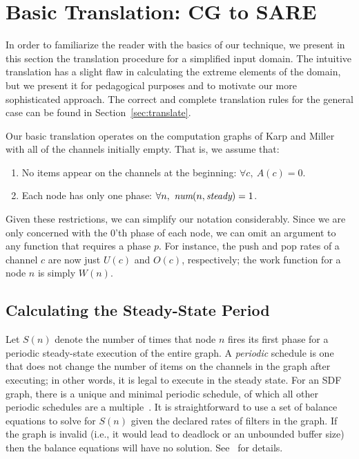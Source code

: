 \section{Basic Translation: CG to SARE}
\label{sec:simple}

In order to familiarize the reader with the basics of our technique,
we present in this section the translation procedure for a simplified
input domain.  The intuitive translation has a slight flaw in
calculating the extreme elements of the domain, but we present it for
pedagogical purposes and to motivate our more sophisticated approach.
The correct and complete translation rules for the general case can be
found in Section~\ref{sec:translate}.

Our basic translation operates on the computation graphs of Karp and
Miller~\cite{KM66} with all of the channels initially empty.  That is,
we assume that:
\begin{enumerate}

\item No items appear on the channels at the beginning:  $\forall c,~A(c) = 0$.

\item Each node has only one phase: $\forall n,~\mbox{\it num}(n, \mbox{\it steady}) = 1$.

\end{enumerate}

Given these restrictions, we can simplify our notation considerably.
Since we are only concerned with the 0'th phase of each node, we can
omit an argument to any function that requires a phase $p$.  For
instance, the push and pop rates of a channel $c$ are now just $U(c)$
and $O(c)$, respectively; the work function for a node $n$ is simply
$W(n)$.



\subsection{Calculating the Steady-State Period}
\label{sec:balance}

Let $S(n)$ denote the number of times that node $n$ fires its first
phase for a periodic steady-state execution of the entire graph. A
{\it periodic} schedule is one that does not change the number of
items on the channels in the graph after executing; in other words, it
is legal to execute in the steady state.  For an SDF graph, there is a
unique and minimal periodic schedule, of which all other periodic
schedules are a multiple~\cite{leesdf}.  It is straightforward to use
a set of balance equations to solve for $S(n)$ given the declared
rates of filters in the graph.  If the graph is invalid (i.e., it
would lead to deadlock or an unbounded buffer size) then the balance
equations will have no solution.  See~\cite{leesdf} for details.

